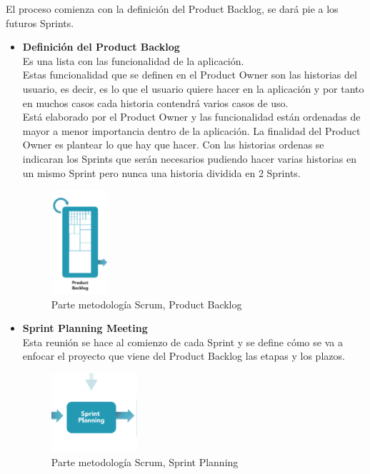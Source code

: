 El proceso comienza con la definición del Product Backlog, se dará pie a los futuros Sprints.
\begin{itemize}
\item \textbf{Definición del Product Backlog}\\
Es una lista con las funcionalidad de la aplicación.\\
Estas funcionalidad que se definen en el Product Owner son las historias del usuario, es decir, es lo que el usuario quiere hacer en la aplicación y por tanto en muchos casos cada historia contendrá varios casos de uso. \\
Está elaborado por el Product Owner y las funcionalidad están ordenadas de mayor a menor importancia dentro de la aplicación. La finalidad del Product Owner es plantear lo que hay que hacer.
Con las historias ordenas se indicaran los Sprints que serán necesarios pudiendo hacer  varias historias en un mismo Sprint pero nunca una historia dividida en 2 Sprints. 

 
 \begin{figure}[H]
		\centering
		\includegraphics[width=0.2\textwidth] {product.png}
		\caption{Parte metodología Scrum, Product Backlog }
	\end{figure} 


\item \textbf{Sprint Planning Meeting}\\
 Esta reunión se hace al comienzo de cada Sprint y se define cómo se va a enfocar el proyecto que viene del Product Backlog las etapas y los plazos.
\begin{figure}[H]
		\centering
		\includegraphics[width=0.3\textwidth] {planing.png}
		\caption{Parte metodología Scrum, Sprint Planning }
	\end{figure} 


\end{itemize}
